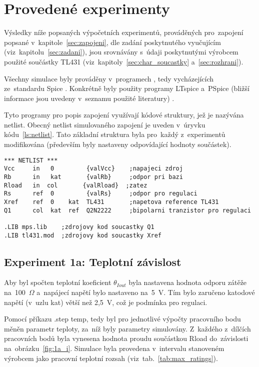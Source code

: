 \documentclass[12pt]{CLASS/protokol}
\begin{document}
\section{Provedené experimenty}\label{sec:experimenty}
    Výsledky níže popsaných výpočetních experimentů, prováděných pro~zapojení popsané v~kapitole~\ref{sec:zapojeni}, dle zadání poskytnutého vyučujícím (viz~kapitolu~\ref{sec:zadani}), jsou srovnávány s~údaji poskytnutými výrobcem použité součástky TL431 (viz~kapitoly~\ref{sec:char_soucastky} a~\ref{sec:rozhrani}).
    \par
    Všechny simulace byly prováděny v~programech , tedy vycházejících ze~standardu Spice \cite{spice_berkeley}. Konkrétně byly použity programy LTspice a~PSpice (bližší informace jsou uvedeny v~seznamu použité literatury) \cite{LTspice,student_pspice,pspice}.
    \par
    Tyto programy pro popis zapojení využívají kódové struktury, jež je nazývána netlist. Obecný netlist simulovaného zapojení je uveden v~úryvku kódu~\ref{ls:netlist}. Tato základní struktura byla pro~každý z~experimentů modifikována (především byly nastaveny odpovídající hodnoty součástek).
    \vspace{3.5cm}

    \begin{lstlisting}[label=ls:netlist,caption=Netlist pro zapojení popsané v~kapitole~\ref{sec:zapojeni}]
*** NETLIST ***
Vcc 	in   0         {valVcc}    ;napajeci zdroj
Rb      in   kat       {valRb}     ;odpor pri bazi
Rload   in  col       {valRload}  ;zatez
Rs      ref  0 	       {valRs}     ;odpor pro regulaci
Xref 	ref  0    kat  TL431       ;napetova reference TL431
Q1      col  kat  ref  Q2N2222     ;bipolarni tranzistor pro regulaci

.LIB mps.lib    ;zdrojovy kod soucastky Q1
.LIB tl431.mod  ;zdrojovy kod soucastky Xref
    \end{lstlisting}

    \newpage
    \subsection{Experiment 1a: Teplotní závislost}\label{subsec:1a}
        Aby byl spočten teplotní koeficient $\theta_{Iout}$ byla nastavena hodnota odporu zátěže na~100~$\Omega$ a~napájecí napětí bylo nastaveno na~5~V. Tím bylo zaručeno katodové napětí (v~uzlu kat) větší než 2,5~V, což je podmínka pro regulaci.
        \par
        Pomocí příkazu .step temp, tedy  byl pro jednotlivé výpočty pracovního bodu měněn parametr teploty, za~níž byly parametry simulovány. Z~každého z~dílčích pracovních bodů byla vynesena hodnota proudu součástkou Rload do~závislosti na~obrázku~\ref{fig:1a_i}. Simulace byla provedena v~intervalu stanoveném výrobcem jako pracovní teplotní rozsah (viz~tab.~\ref{tab:max_ratings}).
        \vspace{2cm}
        
\end{document}
